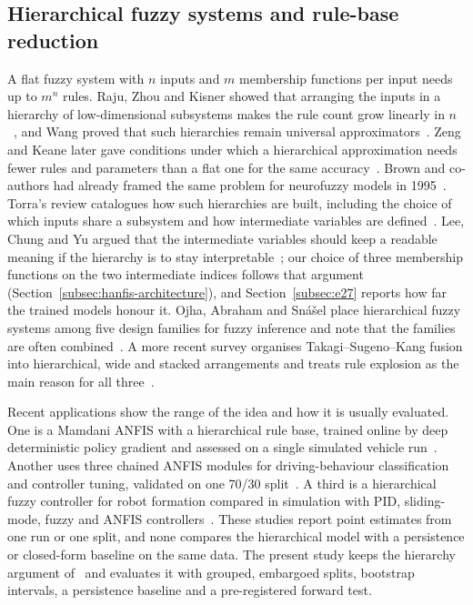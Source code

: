 \documentclass[referee,lineno,pdflatex,sn-basic]{sn-jnl}%
\theoremstyle{thmstyleone}%
\theoremstyle{thmstyletwo}%
\theoremstyle{thmstylethree}%
\begin{document}
\subsection{Hierarchical fuzzy systems and rule-base reduction}\label{subsec:lit-hfs}
A flat fuzzy system with $n$ inputs and $m$ membership functions per input needs up to $m^{n}$ rules. Raju, Zhou and Kisner showed that arranging the inputs in a hierarchy of low-dimensional subsystems makes the rule count grow linearly in $n$~\citep{raju1991}, and Wang proved that such hierarchies remain universal approximators~\citep{wang1998hierarchical}. Zeng and Keane later gave conditions under which a hierarchical approximation needs fewer rules and parameters than a flat one for the same accuracy~\citep{zeng2005approximation}. Brown and co-authors had already framed the same problem for neurofuzzy models in 1995~\citep{brown1995curse}. Torra's review catalogues how such hierarchies are built, including the choice of which inputs share a subsystem and how intermediate variables are defined~\citep{torra2002review}. Lee, Chung and Yu argued that the intermediate variables should keep a readable meaning if the hierarchy is to stay interpretable~\citep{lee2003hierarchical}; our choice of three membership functions on the two intermediate indices follows that argument (Section~\ref{subsec:hanfis-architecture}), and Section~\ref{subsec:e27} reports how far the trained models honour it. Ojha, Abraham and Sn\'{a}\v{s}el place hierarchical fuzzy systems among five design families for fuzzy inference and note that the families are often combined~\citep{ojha2019heuristic}. A more recent survey organises Takagi--Sugeno--Kang fusion into hierarchical, wide and stacked arrangements and treats rule explosion as the main reason for all three~\citep{zhang2024tsk}.

Recent applications show the range of the idea and how it is usually evaluated. One is a Mamdani ANFIS with a hierarchical rule base, trained online by deep deterministic policy gradient and assessed on a single simulated vehicle run~\citep{juston2024hrbr}. Another uses three chained ANFIS modules for driving-behaviour classification and controller tuning, validated on one 70/30 split~\citep{parthiban2026anfis}. A third is a hierarchical fuzzy controller for robot formation compared in simulation with PID, sliding-mode, fuzzy and ANFIS controllers~\citep{wu2025hffc}. These studies report point estimates from one run or one split, and none compares the hierarchical model with a persistence or closed-form baseline on the same data. The present study keeps the hierarchy argument of~\citet{raju1991,wang1998hierarchical} and evaluates it with grouped, embargoed splits, bootstrap intervals, a persistence baseline and a pre-registered forward test.
\end{document}
